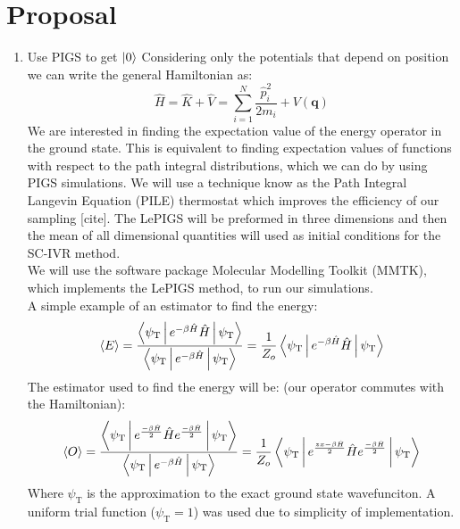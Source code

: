 \documentclass[12pt,letterpaper,oneside,final,titlepage]{article}               %
\numberwithin{equation}{section} %
\newcommand{\psiT}{\psi_{\textrm{T}}}
\renewcommand{\vec}[1]{\mathbf{#1}}
\begin{document}
\section{Proposal}
\begin{enumerate}
    \item Use PIGS to get $\ket{0}$
    Considering only the potentials that depend on position we can write the general Hamiltonian as:
    \begin{equation}
        \hat{H} = \hat{K} + \hat{V} = \sum_{i=1}^{N}\frac{\hat{p}_{i}^2}{2m_{i}} + V(\vec{q})
    \end{equation}
    We are interested in finding the expectation value of the energy operator in the ground state. 
    This is equivalent to finding expectation values of functions with respect to the path integral distributions, which we can do by using PIGS simulations.
    We will use a technique know as the Path Integral Langevin Equation (PILE) thermostat which improves the efficiency of our sampling [cite].
    The LePIGS will be preformed in three dimensions and then the mean of all dimensional quantities will used as initial conditions for the SC-IVR method. \\
    We will use the software package Molecular Modelling Toolkit (MMTK), which implements the LePIGS method, to run our simulations.\\
    A simple example of an estimator to find the energy:
    \begin{equation}
        \Braket{E} 
        = \frac{\Braket{\psiT|e^{-\beta\hat{H}}\hat{H}|\psiT}}{\Braket{\psiT|e^{-\beta\hat{H}}|\psiT}} 
        = \frac{1}{Z_{o}} \Braket{\psiT|e^{-\beta\hat{H}} \hat{H}|\psiT}
    \end{equation}
    The estimator used to find the energy will be: (our operator commutes with the Hamiltonian):
    \begin{equation}
        \Braket{O} 
        = \frac{\Braket{\psiT|e^{\frac{-\beta\hat{H}}{2}} \hat{H} e^{\frac{-\beta\hat{H}}{2}}|\psiT}}{\Braket{\psiT|e^{-\beta\hat{H}}|\psiT}} 
        = \frac{1}{Z_{o}} \Braket{\psiT|e^{\frac{zx-\beta\hat{H}}{2}} \hat{H} e^{\frac{-\beta\hat{H}}{2}}|\psiT}
    \end{equation}
    Where $\psiT$ is the approximation to the exact ground state wavefunciton. 
    A uniform trial function ($\psiT = 1$) was used due to simplicity of implementation.


\end{enumerate}
\end{document}

